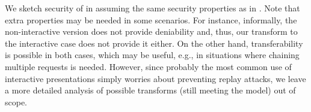 We sketch security of \CUASGenInt in  assuming
the same security properties as in \UAS. Note that extra properties may be
needed in some scenarios. For instance, informally, the non-interactive version
does not provide deniability and, thus, our transform to the interactive case
does not provide it either. On the other hand, transferability is possible in
both cases, which may be useful, e.g., in situations where chaining multiple
requests is needed.
%
However, since probably the most common use of interactive presentations simply
worries about preventing replay attacks, we leave a more detailed analysis of
possible transforms (still meeting the \UAS model) out of scope.

